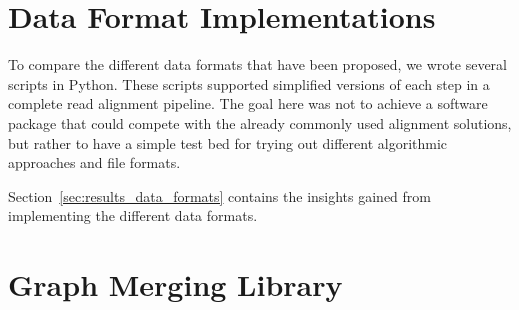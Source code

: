 \documentclass[a4paper,12pt,twoside,BCOR=10mm]{scrbook}
\begin{document}

\section{Data Format Implementations}
%

To compare the different data formats that have been proposed, 
we wrote several scripts in Python. 
These scripts supported simplified versions of each step in a complete read alignment pipeline. 
The goal here was not to achieve a software package that could compete with 
the already commonly used alignment solutions, but rather to have a 
simple test bed for trying out different algorithmic approaches and file formats.

Section~\ref{sec:results_data_formats} contains the insights gained from 
implementing the different data formats.

\section{Graph Merging Library}
%
\end{document}
